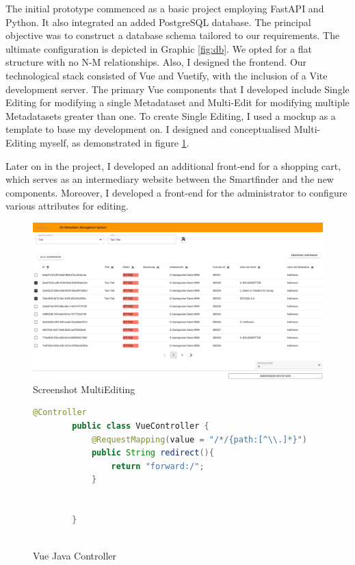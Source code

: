 \documentclass[11pt, titlepage, a4paper]{article}
\begin{document}
The initial prototype commenced as a basic project employing FastAPI and Python. It also integrated an added PostgreSQL database. The principal objective was to construct a database schema tailored to our requirements. The ultimate configuration is depicted in Graphic \ref{fig:db}. We opted for a flat structure with no N-M relationships. 
Also, I designed the frontend. Our technological stack consisted of Vue and Vuetify, with the inclusion of a Vite development server. The primary Vue components that I developed include Single Editing for modifying a single Metadataset and Multi-Edit for modifying multiple Metadatasets greater than one. To create Single Editing, I used a mockup as a template to base my development on. I designed and conceptualised Multi-Editing myself, as demonstrated in figure \ref{fig:multiedit}.  

Later on in the project, I developed an additional front-end for a shopping cart, which serves as an intermediary website between the Smartfinder and the new components. Moreover, I developed a front-end for the administrator to configure various attributes for editing.

\begin{figure}[t]
	\caption{Screenshot MultiEditing}
	\label{fig:multiedit}
	\includegraphics[width=16cm]{multiedit.png}
	\centering
\end{figure}
\begin{figure}[t]
	\caption{Vue Java Controller}
	\label{fig:vue}
	\begin{lstlisting}[language=java, frame=single]
        @Controller
        public class VueController {
            @RequestMapping(value = "/*/{path:[^\\.]*}")
            public String redirect(){
                return "forward:/";
            }
        
        
        }
        
        \end{lstlisting}
	\centering
\end{figure}
\end{document}
